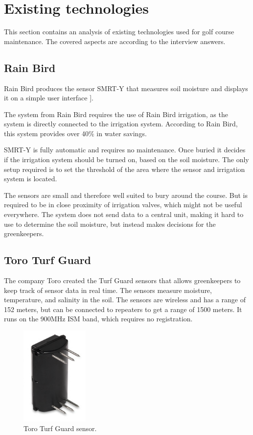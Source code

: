 \section{Existing technologies}
This section contains an analysis of existing technologies used for golf course maintenance. The covered aspects are according to the interview answers.

\subsection{Rain Bird}
Rain Bird produces the sensor SMRT-Y that measures soil moisture and displays it on a simple user interface \cite{smrty}].

The system from Rain Bird requires the use of Rain Bird irrigation, as the system is directly connected to the irrigation system. 
According to Rain Bird, this system provides over 40\% in water savings\cite{smrty2}.

SMRT-Y is fully automatic and requires no maintenance. Once buried it decides if the irrigation system should be turned on, based on the soil moisture. 
The only setup required is to set the threshold of the area where the sensor and irrigation system is located\cite{smrty2}.

The sensors are small and therefore well suited to bury around the course. But is required to be in close proximity of irrigation valves, which might not be useful everywhere.
The system does not send data to a central unit, making it hard to use to determine the soil moisture, but instead makes decisions for the greenkeepers. 

\subsection{Toro Turf Guard\texttrademark{}}
The company Toro created the Turf Guard\texttrademark{} sensors that allows greenkeepers to keep track of sensor data in real time. The sensors measure moisture, temperature, and salinity in the soil\cite{turfGuard}.
The sensors are wireless and has a range of 152 meters, but can be connected to repeaters to get a range of 1500 meters\cite{turfGuard}. It runs on the 900MHz ISM band, which requires no registration.

\begin{figure}
\begin{center}
\includegraphics[width=0.3\textwidth]{chapters/analysis/figs/Turfguard.png}
\caption{Toro Turf Guard\texttrademark{} sensor\cite{turfGuard2}.}
\label{fig:turfguard}
\end{center}
\end{figure}

